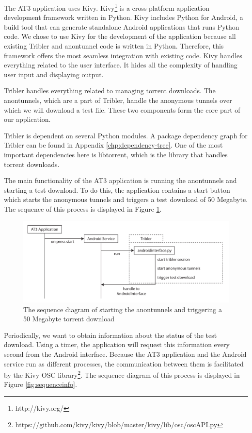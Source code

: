 The AT3 application uses Kivy. Kivy\footnote{http://kivy.org/} is a cross-platform application development framework written in Python. Kivy includes Python for Android, a build tool that can generate standalone Android applications that runs Python code. We chose to use Kivy for the development of the application because all existing Tribler and anontunnel code is written in Python. Therefore, this framework offers the most seamless integration with existing code. Kivy handles everything related to the user interface. It hides all the complexity of handling user input and displaying output.

Tribler handles everything related to managing torrent downloads. The anontunnels, which are a part of Tribler, handle the anonymous tunnels over which we will download a test file. These two components form the core part of our application.

Tribler is dependent on several Python modules. A package dependency graph for Tribler can be found in Appendix \ref{chp:dependency-tree}. One of the most important dependencies here is libtorrent, which is the library that handles torrent downloads.

The main functionality of the AT3 application is running the anontunnels and starting a test download. To do this, the application contains a start button which starts the anonymous tunnels and triggers a test download of 50 Megabyte. The sequence of this process is displayed in Figure \ref{fig:sequencestart}.

\begin{figure}[!h]
	\centering
	\includegraphics[width=\textwidth]{graphics/sequence-start.pdf}
	\caption{The sequence diagram of starting the anontunnels and triggering a 50 Megabyte torrent download}
	\label{fig:sequencestart}
\end{figure}

Periodically, we want to obtain information about the status of the test download. Using a timer, the application will request this information every second from the Android interface. Because the AT3 application and the Android service run as different processes, the communication between them is facilitated by the Kivy OSC library\footnote{https://github.com/kivy/kivy/blob/master/kivy/lib/osc/oscAPI.py}. The sequence diagram of this process is displayed in Figure \ref{fig:sequenceinfo}.

